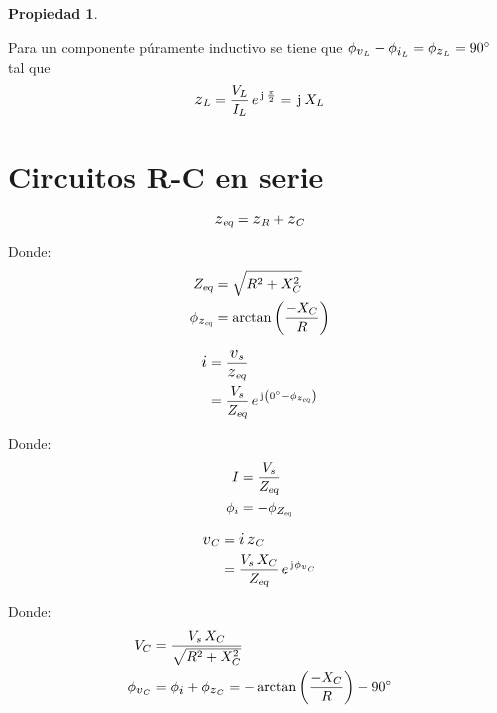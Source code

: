 \documentclass[a5paper,12pt,twoside]{book}
\newtheorem{prop}{{Propiedad}}[chapter]
\begin{document}
\begin{mdframed}[style=MyFrame1]
    \begin{prop}
    \end{prop}
    Para un componente púramente inductivo se tiene que $\phi_{\voltage_L} - \phi_{\current_L} = \phi_{\impedance_L} = \ang{90}$ tal que
    \begin{equation*}
        \impedance_L = \frac{V_L}{I_L} \, e^{\iu \, \frac{\pi}{2}} = \iu \, X_L
    \end{equation*}
\end{mdframed}


\section{Circuitos R-C en serie}

\begin{equation*}
    \sub{\impedance}{eq} = \impedance_R + \impedance_C
\end{equation*}

Donde:
\begin{align*}
    \sub{Z}{eq} &= \sqrt{R^2 + X_C^2}
    \\
    \phi_{\sub{\impedance}{eq}} &= \arctan{\bb{\dfrac{-X_C}{R}}}
\end{align*}

\begin{align*}
    \current &= \frac{\voltage_s}{\sub{\impedance}{eq}}
    \\
    &= \frac{V_s}{\sub{Z}{eq}} \, e^{\iu \bb{\ang{0} - \phi_{\sub{\impedance}{eq}}}}
\end{align*}

Donde:
\begin{align*}
    I &= \frac{V_s}{{{Z}_\textsl{{eq}}}}
    \\
    \phi_i &= - \phi_{{{Z}_\textsl{{eq}}}}
\end{align*}

\begin{align*}
    \voltage_C &= \current \, \impedance_C
    \\
    &= \frac{V_s \, X_C}{\sub{Z}{eq}} \, e^{\iu \phi_{\voltage_C}}
\end{align*}

Donde:
\begin{align*}
    V_C &= \frac{V_s \, X_C}{\sqrt{R^2 + X_C^2}}
    \\
    \phi_{\voltage_C} &= \phi_\current + \phi_{\impedance_C} = - \arctan{\bb{\dfrac{-X_C}{R} }} - \ang{90}
\end{align*}
\end{document}
